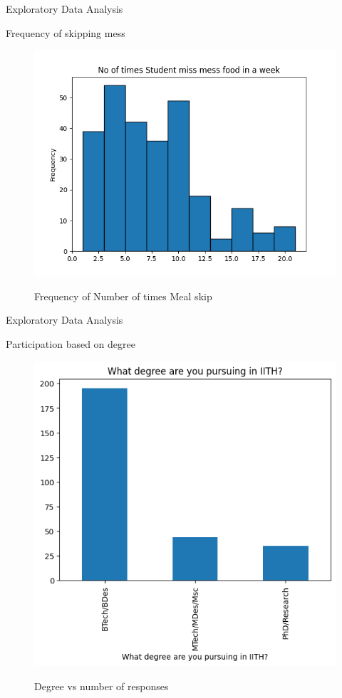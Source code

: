 \documentclass{beamer}
\begin{document}
\begin{frame}{Exploratory Data Analysis}
\begin{block}{Frequency of skipping mess}
\begin{figure}
      \centering
    \caption{Frequency of Number of times Meal skip }
    \includegraphics[scale = 0.55]{histogram_meal_skip.png}  
    \label{histogram_meal_skip}
\end{figure}
\end{block}
\end{frame}
\begin{frame}{Exploratory Data Analysis}
\begin{block}{Participation based on degree}
\begin{figure}
      \centering
    \caption{Degree vs number of responses }
    \includegraphics[scale = 0.55]{bar_degree.png}  
    \label{fig:side-by-side}
\end{figure}
\end{block}
\end{frame}
\end{document}
